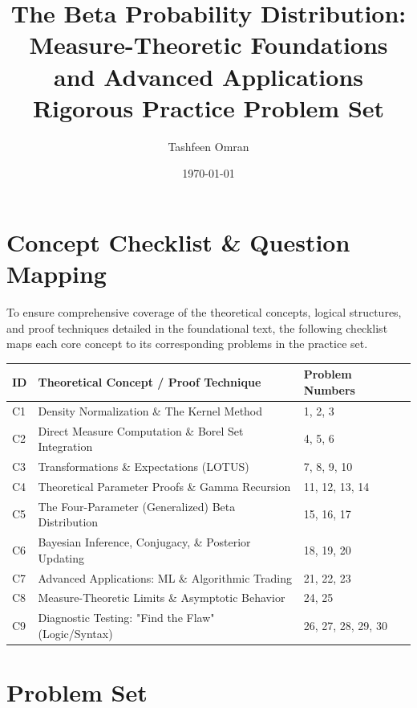 \documentclass[11pt, a4paper]{article}
\title{The Beta Probability Distribution: \\ Measure-Theoretic Foundations and Advanced Applications \\ \large Rigorous Practice Problem Set}
\author{Tashfeen Omran}
\date{\today}
\theoremstyle{definition}
\theoremstyle{remark}
\begin{document}
\maketitle
\tableofcontents
\newpage

\section{Concept Checklist \& Question Mapping}

To ensure comprehensive coverage of the theoretical concepts, logical structures, and proof techniques detailed in the foundational text, the following checklist maps each core concept to its corresponding problems in the practice set.

\renewcommand{\arraystretch}{1.5}
\noindent
\begin{tabularx}{\textwidth}{l X l}
\toprule
\textbf{ID} & \textbf{Theoretical Concept / Proof Technique} & \textbf{Problem Numbers} \\
\midrule
C1 & Density Normalization \& The Kernel Method & 1, 2, 3 \\
C2 & Direct Measure Computation \& Borel Set Integration & 4, 5, 6 \\
C3 & Transformations \& Expectations (LOTUS) & 7, 8, 9, 10 \\
C4 & Theoretical Parameter Proofs \& Gamma Recursion & 11, 12, 13, 14 \\
C5 & The Four-Parameter (Generalized) Beta Distribution & 15, 16, 17 \\
C6 & Bayesian Inference, Conjugacy, \& Posterior Updating & 18, 19, 20 \\
C7 & Advanced Applications: ML \& Algorithmic Trading & 21, 22, 23 \\
C8 & Measure-Theoretic Limits \& Asymptotic Behavior & 24, 25 \\
C9 & Diagnostic Testing: "Find the Flaw" (Logic/Syntax) & 26, 27, 28, 29, 30 \\
\bottomrule
\end{tabularx}
\vspace{1em}

\section{Problem Set}
\end{document}
